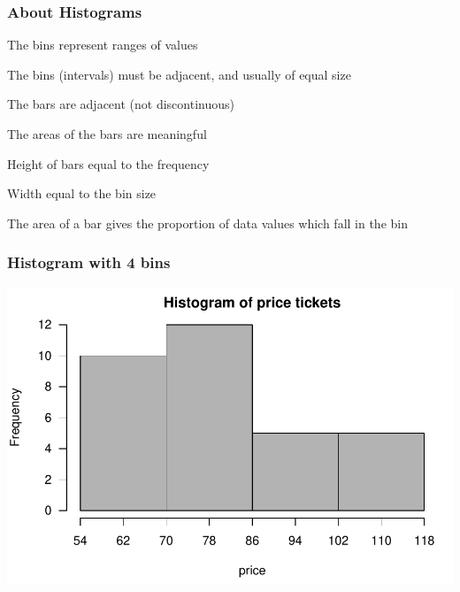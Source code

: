\documentclass[12pt]{beamer}\usepackage[]{graphicx}\usepackage[]{color}
\newenvironment{knitrout}{}{} %
\begin{document}
\begin{frame}
\frametitle{About Histograms}

\bi
  \item The bins represent ranges of values
  \item The bins (intervals) must be adjacent, and usually of equal size
  \item The bars are adjacent (not discontinuous)
  \item The areas of the bars are meaningful
  \item Height of bars equal to the frequency
  \item Width equal to the bin size
  \item The area of a bar gives the proportion of data values which fall in the bin
\ei

\end{frame}


\begin{frame}[fragile]
\frametitle{Histogram with 4 bins}
\begin{knitrout}\footnotesize
{}\color{fgcolor}

{\centering \includegraphics[width=.8\linewidth,height=.6\linewidth]{figure/unnamed-chunk-19-1} 

}



\end{knitrout}

\end{frame}

\end{document}
